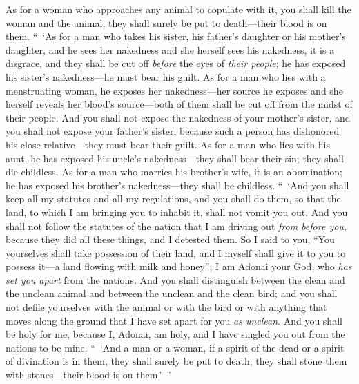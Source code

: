 \begin{biblechapter}
\verse As for a woman who approaches any animal to copulate with it, you shall kill the woman and the animal; they shall surely be put to death—their blood is on them.
\verse “ ‘As for a man who takes his sister, his father’s daughter or his mother’s daughter, and he sees her nakedness and she herself sees his nakedness, it is a disgrace, and they shall be cut off \textit{before} the eyes of \textit{their people}; he has exposed his sister’s nakedness—he must bear his guilt.
\verse As for a man who lies with a menstruating woman, he exposes her nakedness—her source he exposes and she herself reveals her blood’s source—both of them shall be cut off from the midst of their people.
\verse And you shall not expose the nakedness of your mother’s sister, and you shall not expose your father’s sister, because such a person has dishonored his close relative—they must bear their guilt.
\verse As for a man who lies with his aunt, he has exposed his uncle’s nakedness—they shall bear their sin; they shall die childless.
\verse As for a man who marries his brother’s wife, it is an abomination; he has exposed his brother’s nakedness—they shall be childless.
 “ ‘And you shall keep all my statutes and all my regulations, and you shall do them, so that the land, to which I am bringing you to inhabit it, shall not vomit you out.
\verse And you shall not follow the statutes of the nation that I am driving out \textit{from before you}, because they did all these things, and I detested them.
\verse So I said to you, “You yourselves shall take possession of their land, and I myself shall give it to you to possess it—a land flowing with milk and honey”; I am Adonai your God, who \textit{has set you apart} from the nations.
\verse And you shall distinguish between the clean and the unclean animal and between the unclean and the clean bird; and you shall not defile yourselves with the animal or with the bird or with anything that moves along the ground that I have set apart for you \textit{as unclean}.
\verse And you shall be holy for me, because I, Adonai, am holy, and I have singled you out from the nations to be mine.
\verse “ ‘And a man or a woman, if a spirit of the dead or a spirit of divination is in them, they shall surely be put to death; they shall stone them with stones—their blood is on them.’ ”
\end{biblechapter}

